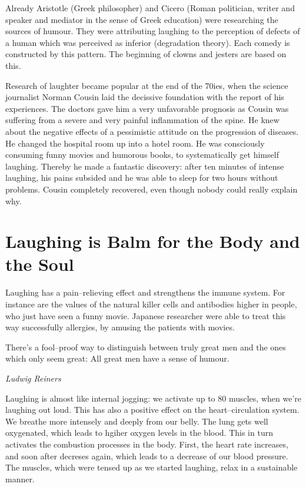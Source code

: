 \documentclass[../Book.Stress_regulation.tex]{subfiles}
\begin{document}
Already Aristotle (Greek philosopher) and Cicero
(Roman politician, writer and speaker and mediator in the sense of Greek education) were researching the sources of humour.
They were attributing laughing to the perception of defects of a human which was perceived as inferior (degradation theory).
Each comedy is constructed by this pattern.
The beginning of clowns and jesters are based on this.

Research of laughter became popular at the end of the 70ies, when the science journalist Norman Cousin laid the decissive foundation with the report of his experiences.
The doctors gave him a very unfavorable prognosis as Cousin was suffering from a severe and very painful inflammation of the spine.
He  knew about the negative effects of a pessimistic attitude on the progression of diseases.
He changed the hospital room up into a hotel room.
He was consciously consuming funny movies and humorous books, to systematically get himself laughing.
Thereby he made a fantastic discovery: after ten minutes of intense laughing, his pains subsided and he was able to sleep for two hours without problems.
Cousin completely recovered, even though nobody could really explain why.

\section{Laughing is Balm for the Body and the Soul}

Laughing has a pain--relieving effect and strengthens the immune system.
For instance are the values of the natural killer cells and antibodies higher in people, who just have seen a funny movie.
Japanese researcher were able to treat this way successfully allergies, by amusing the patients with movies.

\epigraph{There's a fool--proof way to distinguish between truly great men and the ones which only seem great: All great men have a sense of humour.}{\textit{Ludwig Reiners}}

Laughing is almost like internal jogging: we activate up to 80 muscles, when we're laughing out loud.
This has also a positive effect on the heart--circulation system.
We breathe more intensely and deeply from our belly.
The lung gets well oxygenated, which leads to hgiher oxygen levels in the blood.
This in turn activates the combustion processes in the body.
First, the heart rate increases, and soon after decreses again, which leads to a decrease of our blood pressure.
The muscles, which were tensed up as we started laughing, relax in a sustainable manner.
\end{document}
